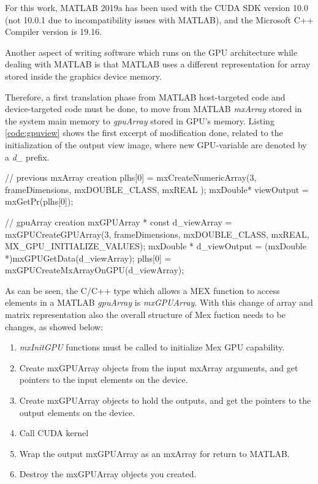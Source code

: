 \documentclass[12pt,a4paper]{extarticle}
\newcommand{\linespace}{\vspace{8pt}}
\begin{document}
For this work, MATLAB 2019a has been used with the CUDA SDK version 10.0 (not 10.0.1 due to incompatibility issues with MATLAB), and the Microsoft C++ Compiler version is 19.16.
\linespace

Another aspect of writing software which runs on the GPU architecture while dealing with MATLAB is that MATLAB uses a different representation for array stored inside the graphics device memory.

Therefore, a first translation phase from MATLAB host-targeted code and device-targeted code must be done, to move from MATLAB \textit{mxArray} stored in the system main memory to \textit{gpuArray} stored in GPU's memory. Listing \ref{code:gpuview} shows the first excerpt of modification done, related to the initialization of the output view image, where new GPU-variable are denoted by a \textit{d\_} prefix.

\begin{cpp}[caption={Output view image initialization code differences from mxArray and gpuArray.},label=code:gpuview]
// previous mxArray creation 
plhs[0] = mxCreateNumericArray(3, 
	frameDimensions, 
	mxDOUBLE_CLASS, 
	mxREAL
);
mxDouble* viewOutput = mxGetPr(plhs[0]);

// gpuArray creation
mxGPUArray * const  d_viewArray = mxGPUCreateGPUArray(3, 
	frameDimensions, 
	mxDOUBLE_CLASS, 
	mxREAL, 
	MX_GPU_INITIALIZE_VALUES);
mxDouble * d_viewOutput = (mxDouble *)mxGPUGetData(d_viewArray);
plhs[0] = mxGPUCreateMxArrayOnGPU(d_viewArray);
\end{cpp}

As can be seen, the C/C++ type which allows a MEX function to access elements in a MATLAB \textit{gpuArray} is \textit{mxGPUArray}. With this change of array and matrix representation also the overall structure of Mex fuction needs to be changes, as showed below:

\begin{enumerate}
\item \textit{mxInitGPU} functions must be called to initialize Mex GPU capability.
\item Create mxGPUArray objects from the input mxArray arguments, and get pointers to the input elements on the device.
\item Create mxGPUArray objects to hold the outputs, and get the pointers to the output elements on the device.
\item Call CUDA kernel 
\item Wrap the output mxGPUArray as an mxArray for return to MATLAB.
\item Destroy the mxGPUArray objects you created.
\end{enumerate}
\end{document}
